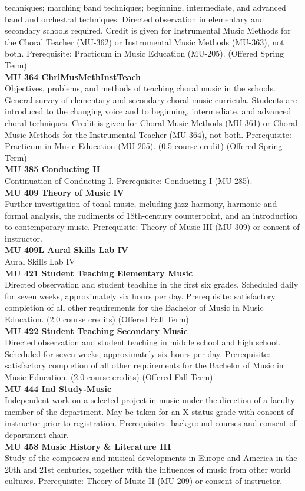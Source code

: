 \documentclass[
  letterpaper,
]{scrbook}
\begin{document}
techniques; marching band techniques; beginning, intermediate, and
advanced band and orchestral techniques. Directed observation in
elementary and secondary schools required. Credit is given for
Instrumental Music Methods for the Choral Teacher (MU-362) or
Instrumental Music Methods (MU-363), not both. Prerequisite: Practicum
in Music Education (MU-205). (Offered Spring Term)\\
\textbf{MU 364 ChrlMusMethInstTeach}\\
Objectives, problems, and methods of teaching choral music in the
schools. General survey of elementary and secondary choral music
curricula. Students are introduced to the changing voice and to
beginning, intermediate, and advanced choral techniques. Credit is given
for Choral Music Methods (MU-361) or Choral Music Methods for the
Instrumental Teacher (MU-364), not both. Prerequisite: Practicum in
Music Education (MU-205). (0.5 course credit) (Offered Spring Term)\\
\textbf{MU 385 Conducting II}\\
Continuation of Conducting I. Prerequisite: Conducting I (MU-285).\\
\textbf{MU 409 Theory of Music IV}\\
Further investigation of tonal music, including jazz harmony, harmonic
and formal analysis, the rudiments of 18th-century counterpoint, and an
introduction to contemporary music. Prerequisite: Theory of Music III
(MU-309) or consent of instructor.\\
\textbf{MU 409L Aural Skills Lab IV}\\
Aural Skills Lab IV\\
\textbf{MU 421 Student Teaching Elementary Music}\\
Directed observation and student teaching in the first six grades.
Scheduled daily for seven weeks, approximately six hours per day.
Prerequisite: satisfactory completion of all other requirements for the
Bachelor of Music in Music Education. (2.0 course credits) (Offered Fall
Term)\\
\textbf{MU 422 Student Teaching Secondary Music}\\
Directed observation and student teaching in middle school and high
school. Scheduled for seven weeks, approximately six hours per day.
Prerequisite: satisfactory completion of all other requirements for the
Bachelor of Music in Music Education. (2.0 course credits) (Offered Fall
Term)\\
\textbf{MU 444 Ind Study-Music}\\
Independent work on a selected project in music under the direction of a
faculty member of the department. May be taken for an X status grade
with consent of instructor prior to registration. Prerequisites:
background courses and consent of department chair.\\
\textbf{MU 458 Music History \& Literature III}\\
Study of the composers and musical developments in Europe and America in
the 20th and 21st centuries, together with the influences of music from
other world cultures. Prerequisite: Theory of Music II (MU-209) or
consent of instructor.
\end{document}
